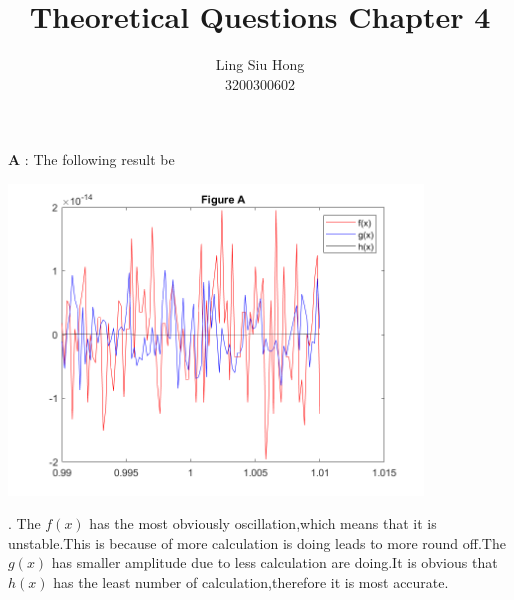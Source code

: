 \documentclass{article}
\title{\textbf{Theoretical Questions Chapter 4}}
\author{Ling Siu Hong \\ 3200300602}
\begin{document}
\maketitle

\textbf{A} : The following result be
    \begin{center}
		  \includegraphics[width=11cm]{Picture A.png}	
    \end{center}.
    The $f(x)$ has the most obviously oscillation,which means that it is unstable.This is because of more calculation is doing leads to more round off.The $g(x)$ has smaller amplitude due to less calculation are doing.It is obvious that $h(x)$ has the least number of calculation,therefore it is most accurate.
\end{document}
